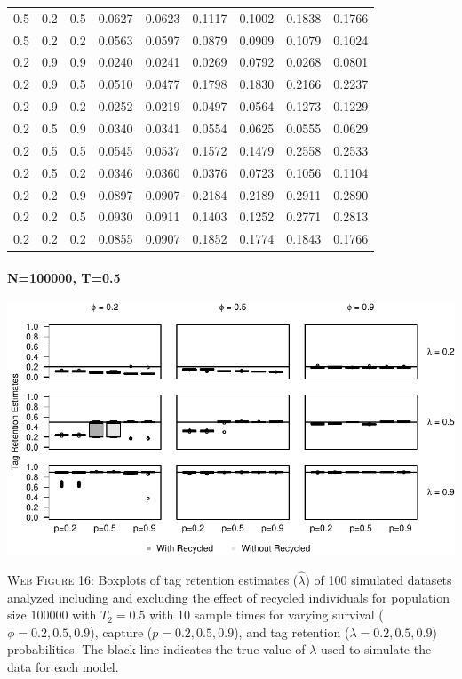\documentclass[]{article}
\let\oldparagraph\paragraph
\renewcommand{\paragraph}[1]{\oldparagraph{#1}\mbox{}}
\begin{document}
\begin{table}[ht]
{\begin{tabular}{rrrrrrrrr}
  0.5 & 0.2 & 0.5 & 0.0627 & 0.0623 & 0.1117 & 0.1002 & 0.1838 & 0.1766 \\ 
  0.5 & 0.2 & 0.2 & 0.0563 & 0.0597 & 0.0879 & 0.0909 & 0.1079 & 0.1024 \\ 
  0.2 & 0.9 & 0.9 & 0.0240 & 0.0241 & 0.0269 & 0.0792 & 0.0268 & 0.0801 \\ 
  0.2 & 0.9 & 0.5 & 0.0510 & 0.0477 & 0.1798 & 0.1830 & 0.2166 & 0.2237 \\ 
  0.2 & 0.9 & 0.2 & 0.0252 & 0.0219 & 0.0497 & 0.0564 & 0.1273 & 0.1229 \\ 
  0.2 & 0.5 & 0.9 & 0.0340 & 0.0341 & 0.0554 & 0.0625 & 0.0555 & 0.0629 \\ 
  0.2 & 0.5 & 0.5 & 0.0545 & 0.0537 & 0.1572 & 0.1479 & 0.2558 & 0.2533 \\ 
  0.2 & 0.5 & 0.2 & 0.0346 & 0.0360 & 0.0376 & 0.0723 & 0.1056 & 0.1104 \\ 
  0.2 & 0.2 & 0.9 & 0.0897 & 0.0907 & 0.2184 & 0.2189 & 0.2911 & 0.2890 \\ 
  0.2 & 0.2 & 0.5 & 0.0930 & 0.0911 & 0.1403 & 0.1252 & 0.2771 & 0.2813 \\ 
  0.2 & 0.2 & 0.2 & 0.0855 & 0.0907 & 0.1852 & 0.1774 & 0.1843 & 0.1766 \\ 
   \hline
\end{tabular}
}
\endgroup
\end{table}

\newpage

\paragraph{N=100000, T=0.5}\label{n100000-t0.5-2}

\includegraphics{Appendix_BW_files/figure-latex/figure16_tagretention_GJSTL3-1.pdf}

\textsc{Web Figure 16:} Boxplots of tag retention estimates
(\(\hat{\lambda}\)) of 100 simulated datasets analyzed including and excluding
the effect of recycled individuals for population size \(100000\) with
\(T_2=0.5\) with 10 sample times for varying survival
(\(\phi=0.2,0.5,0.9\)), capture (\(p=0.2,0.5,0.9\)), and tag retention
(\(\lambda=0.2,0.5,0.9\)) probabilities. The black line indicates the
true value of \(\lambda\) used to simulate the data for each model.
\end{document}
